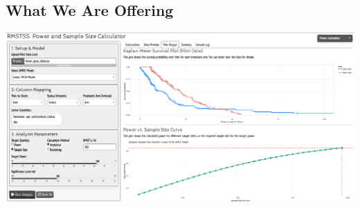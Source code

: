 \documentclass[a0,landscape]{a0poster}
\begin{document}
\begin{minipage}[t]{0.54\linewidth}
    \subsection*{\color{HeadingColor}\huge What We Are Offering}
    {\centering \includegraphics[width=\linewidth,height = 0.65\linewidth]{images/app-ss.png}\par}

\vspace{2cm}    

\end{minipage}
\end{document}
